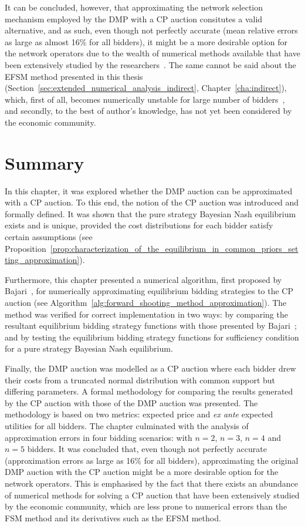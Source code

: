 It can be concluded, however, that approximating the network selection mechanism employed by the DMP with a CP auction consitutes a valid alternative, and as such, even though not perfectly accurate (mean relative errors as large as almost 16\% for all bidders), it might be a more desirable option for the network operators due to the wealth of numerical methods available that have been extensively studied by the researchers~\cite{HubbardPaarsch2011}. The same cannot be said about the EFSM method presented in this thesis (Section~\ref{sec:extended_numerical_analysis_indirect}, Chapter~\ref{cha:indirect}), which, first of all, becomes numerically unstable for large number of bidders~\cite{FibichGavish2011}, and secondly, to the best of author's knowledge, has not yet been considered by the economic community.

\section{Summary} %
\label{sec:summary_approximation}
In this chapter, it was explored whether the DMP auction can be approximated with a CP auction. To this end, the notion of the CP auction was introduced and formally defined. It was shown that the pure strategy Bayesian Nash equilibrium exists and is unique, provided the cost distributions for each bidder satisfy certain assumptions (see Proposition~\ref{prop:characterization_of_the_equilibrium_in_common_priors_setting_approximation}).

Furthermore, this chapter presented a numerical algorithm, first proposed by Bajari~\cite{Bajari2001a}, for numerically approximating equilibrium bidding strategies to the CP auction (see Algorithm~\ref{alg:forward_shooting_method_approximation}). The method was verified for correct implementation in two ways: by comparing the resultant equilibrium bidding strategy functions with those presented by Bajari~\cite{Bajari2001a}; and by testing the equilibrium bidding strategy functions for sufficiency condition for a pure strategy Bayesian Nash equilibrium.

Finally, the DMP auction was modelled as a CP auction where each bidder drew their costs from a truncated normal distribution with common support but differing parameters. A formal methodology for comparing the results generated by the CP auction with those of the DMP auction was presented. The methodology is based on two metrics: expected price and \emph{ex ante} expected utilities for all bidders. The chapter culminated with the analysis of approximation errors in four bidding scenarios: with $n=2$, $n=3$, $n=4$ and $n=5$ bidders. It was concluded that, even though not perfectly accurate (approximation errors as large as 16\% for all bidders), approximating the original DMP auction with the CP auction might be a more desirable option for the network operators. This is emphasised by the fact that there exists an abundance of numerical methods for solving a CP auction that have been extensively studied by the economic community, which are less prone to numerical errors than the FSM method and its derivatives such as the EFSM method.
